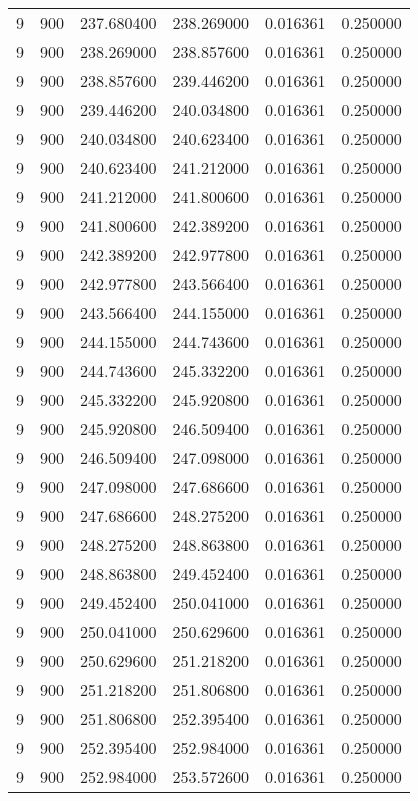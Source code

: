 \begin{longtable}{rrrrrr}
9 & 900 & 237.680400 & 238.269000 & 0.016361 & 0.250000 \\
9 & 900 & 238.269000 & 238.857600 & 0.016361 & 0.250000 \\
9 & 900 & 238.857600 & 239.446200 & 0.016361 & 0.250000 \\
9 & 900 & 239.446200 & 240.034800 & 0.016361 & 0.250000 \\
9 & 900 & 240.034800 & 240.623400 & 0.016361 & 0.250000 \\
9 & 900 & 240.623400 & 241.212000 & 0.016361 & 0.250000 \\
9 & 900 & 241.212000 & 241.800600 & 0.016361 & 0.250000 \\
9 & 900 & 241.800600 & 242.389200 & 0.016361 & 0.250000 \\
9 & 900 & 242.389200 & 242.977800 & 0.016361 & 0.250000 \\
9 & 900 & 242.977800 & 243.566400 & 0.016361 & 0.250000 \\
9 & 900 & 243.566400 & 244.155000 & 0.016361 & 0.250000 \\
9 & 900 & 244.155000 & 244.743600 & 0.016361 & 0.250000 \\
9 & 900 & 244.743600 & 245.332200 & 0.016361 & 0.250000 \\
9 & 900 & 245.332200 & 245.920800 & 0.016361 & 0.250000 \\
9 & 900 & 245.920800 & 246.509400 & 0.016361 & 0.250000 \\
9 & 900 & 246.509400 & 247.098000 & 0.016361 & 0.250000 \\
9 & 900 & 247.098000 & 247.686600 & 0.016361 & 0.250000 \\
9 & 900 & 247.686600 & 248.275200 & 0.016361 & 0.250000 \\
9 & 900 & 248.275200 & 248.863800 & 0.016361 & 0.250000 \\
9 & 900 & 248.863800 & 249.452400 & 0.016361 & 0.250000 \\
9 & 900 & 249.452400 & 250.041000 & 0.016361 & 0.250000 \\
9 & 900 & 250.041000 & 250.629600 & 0.016361 & 0.250000 \\
9 & 900 & 250.629600 & 251.218200 & 0.016361 & 0.250000 \\
9 & 900 & 251.218200 & 251.806800 & 0.016361 & 0.250000 \\
9 & 900 & 251.806800 & 252.395400 & 0.016361 & 0.250000 \\
9 & 900 & 252.395400 & 252.984000 & 0.016361 & 0.250000 \\
9 & 900 & 252.984000 & 253.572600 & 0.016361 & 0.250000 \\

\end{longtable}
